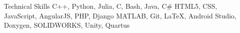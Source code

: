 \begin{rubric}{Technical Skills}
	\entry*[Programming] C++, Python, Julia, C, Bash, Java, C\#
     HTML5, CSS, JavaScript, AngularJS, PHP, Django
    \entry*[Software] MATLAB, Git, \LaTeX, Android Studio, Doxygen, SOLIDWORKS, Unity, Quartus%
\end{rubric}